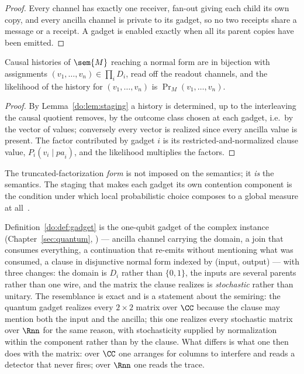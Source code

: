\begin{proof}
Every channel has exactly one receiver, fan-out giving each child its own copy, and every ancilla
channel is private to its gadget, so no two receipts share a message or a receipt. A gadget is
enabled exactly when all its parent copies have been emitted.
\end{proof}

\begin{theorem}
\label{do:thm:adequacy}
Causal histories of $\sem{M}$ reaching a normal form are in bijection with assignments
$(v_1,\dots,v_n) \in \prod_i D_i$, read off the readout channels, and the likelihood of the
history for $(v_1,\dots,v_n)$ is $\Pr_M(v_1,\dots,v_n)$.
\end{theorem}

\begin{proof}
By Lemma~\ref{do:lem:staging} a history is determined, up to the interleaving the causal quotient
removes, by the outcome class chosen at each gadget, i.e.\ by the vector of values; conversely
every vector is realized since every ancilla value is present. The factor contributed by gadget $i$
is its restricted-and-normalized clause value, $P_i(v_i \mid \mathit{pa}_i)$, and the likelihood
multiplies the factors.
\end{proof}

The truncated-factorization \emph{form} is not imposed on the semantics; it \emph{is} the
semantics. The staging that makes each gadget its own contention component is the condition under
which local probabilistic choice composes to a global measure at all~\cite{VaraccaVolzerWinskel}.

\begin{remark}
\label{do:rmk:shor}
Definition~\ref{do:def:gadget} is the one-qubit gadget of the complex instance
(Chapter~\ref{sec:quantum}, \cite{GradedQuantum}) --- ancilla channel carrying the domain, a join
that consumes everything, a continuation that re-emits without mentioning what was consumed, a
clause in disjunctive normal form indexed by (input, output) --- with three changes: the domain is
$D_i$ rather than $\{0,1\}$, the inputs are several parents rather than one wire, and the matrix
the clause realizes is \emph{stochastic} rather than unitary. The resemblance is exact and is a
statement about the semiring: the quantum gadget realizes every $2\times 2$ matrix over $\CC$
because the clause may mention both the input and the ancilla; this one realizes every stochastic
matrix over $\Rnn$ for the same reason, with stochasticity supplied by normalization within the
component rather than by the clause. What differs is what one then does with the matrix: over
$\CC$ one arranges for columns to interfere and reads a detector that never fires; over $\Rnn$ one
reads the trace.
\end{remark}

